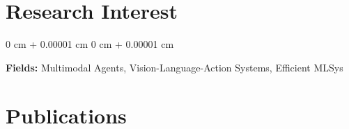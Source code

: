 \documentclass[10pt, letterpaper]{article}
\newenvironment{highlights}{
    \begin{itemize}[
        topsep=0.10 cm,
        parsep=0.10 cm,
        partopsep=0pt,
        itemsep=0pt,
        leftmargin=0 cm + 10pt
    ]
}{
    \end{itemize}
} %
\newenvironment{onecolentry}{
    \begin{adjustwidth}{
        0 cm + 0.00001 cm
    }{
        0 cm + 0.00001 cm
    }
}{
    \end{adjustwidth}
} %
\begin{document}
        \vspace{0.10 cm}
                
         \section{Research Interest}
                
                \begin{onecolentry}
                    \textbf{Fields:}  Multimodal Agents, Vision-Language-Action Systems, Efficient MLSys
                \end{onecolentry}
\vspace{0.1 cm}
        \section{Publications}
\end{document}
